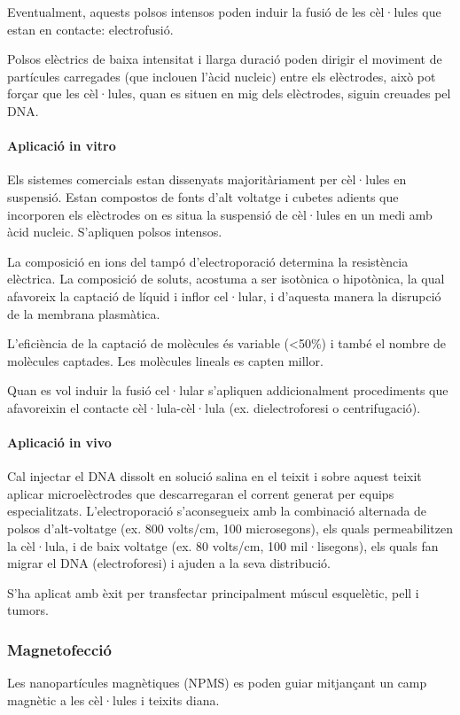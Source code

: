 Eventualment, aquests polsos intensos poden induir la fusió de les cèl·lules que estan en contacte: electrofusió.

Polsos elèctrics de baixa intensitat i llarga duració poden dirigir el moviment de partícules carregades (que inclouen l'àcid nucleic) entre els elèctrodes, això pot forçar que les cèl·lules, quan es situen en mig dels elèctrodes, siguin creuades pel DNA.

\paragraph{Aplicació in vitro}
Els sistemes comercials estan dissenyats majoritàriament per cèl·lules en suspensió. Estan compostos de fonts d'alt voltatge i cubetes adients que incorporen els elèctrodes on es situa la suspensió de cèl·lules en un medi amb àcid nucleic. S'apliquen polsos intensos.

La composició en ions del tampó d'electroporació determina la resistència elèctrica. La composició de soluts, acostuma a ser isotònica o hipotònica, la qual afavoreix la captació de líquid i inflor cel·lular, i d'aquesta manera la disrupció de la membrana plasmàtica.

L'eficiència de la captació de molècules és variable (<50\%) i també el nombre de molècules captades. Les molècules lineals es capten millor.

Quan es vol induir la fusió cel·lular s'apliquen addicionalment procediments que afavoreixin el contacte cèl·lula-cèl·lula (ex. dielectroforesi o centrifugació).

\paragraph{Aplicació in vivo}
Cal injectar el DNA dissolt en solució salina en el teixit i sobre aquest teixit aplicar microelèctrodes que descarregaran el corrent generat per equips especialitzats. L'electroporació s'aconsegueix amb la combinació alternada de polsos d'alt-voltatge (ex. 800 volts/cm, 100 microsegons), els quals permeabilitzen la cèl·lula, i de baix voltatge (ex. 80 volts/cm, 100 mil·lisegons), els quals fan migrar el DNA (electroforesi) i ajuden a la seva distribució.

S'ha aplicat amb èxit per transfectar principalment múscul esquelètic, pell i tumors.

\subsubsection{Magnetofecció}
\label{sec:magnetofeccio}
Les nanopartícules magnètiques (NPMS) es poden guiar mitjançant un camp magnètic a les cèl·lules i teixits diana.

